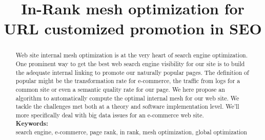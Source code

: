 \documentclass{iSWAGArticle}
\title{In-Rank mesh optimization for URL customized promotion in SEO}
\author{\iSWAGAuthor{Stefan Duprey\\
Cdiscount\\
stefan.duprey@cdiscount.com} \and \iSWAGAuthor{Second Author\\
Second University\\
second.author@university2.com}}
\begin{document}
\maketitle

\begin{abstract}
 Web site internal mesh optimization is at the very heart of search engine optimization. 
 One prominent way to get the best web search engine visibility for our site 
 is to build the adequate internal linking to promote our naturally popular pages. 
 The definition of popular might be the transformation rate for e-commerce, 
 the traffic from logs for a common site or even a semantic quality rate for our page. 
 We here propose an algorithm to automatically compute the optimal internal mesh for our web site.
 We tackle the challenges met both at a theory and software implementation level. 
 We'll more specifically deal with big data issues for an e-commerce web site.
 \\\newline
 \indent \textbf{Keywords: }
 \\\newline
search engine, e-commerce, page rank, in rank, mesh optimization, global optimization
\end{abstract}
\end{document}
